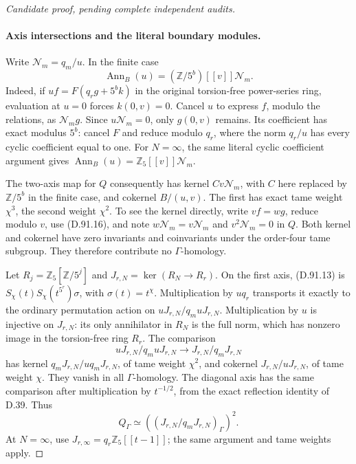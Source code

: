 \begin{proof}[Candidate proof, pending complete independent audits]
\paragraph{Axis intersections and the literal boundary modules.}
Write \(\mathcal N_m=q_m/u\). In the finite case
\[
                 \operatorname{Ann}_B(u)
                   =(\mathbb Z/5^b)[[v]]\mathcal N_m.
                                                               \tag{D.91.16}
\]
Indeed, if \(uf=F(q_rg+5^b k)\) in the original
torsion-free power-series ring, evaluation at \(u=0\)
forces \(k(0,v)=0\). Cancel \(u\) to express \(f\),
modulo the relations, as \(\mathcal N_m g\). Since
\(u\mathcal N_m=0\), only \(g(0,v)\) remains. Its
coefficient has exact modulus \(5^b\): cancel \(F\)
and reduce modulo \(q_r\), where the norm
\(q_r/u\) has every cyclic coefficient equal to one.
For \(N=\infty\), the same literal cyclic coefficient
argument gives \(\operatorname{Ann}_B(u)=\mathbb Z_5[[v]]\mathcal N_m\).

The two-axis map for \(Q\) consequently has kernel
\(Cv\mathcal N_m\), with \(C\) here replaced by
\(\mathbb Z/5^b\) in the finite case, and cokernel
\(B/(u,v)\). The first has exact tame weight \(\chi^3\),
the second weight \(\chi^2\). To see the kernel directly,
write \(vf=wg\), reduce modulo \(v\), use (D.91.16),
and note \(w\mathcal N_m=v\mathcal N_m\) and
\(v^2\mathcal N_m=0\) in \(Q\). Both kernel and
cokernel have zero invariants and coinvariants under the
order-four tame subgroup. They therefore contribute no
\(\Gamma\)-homology.

Let \(R_j=\mathbb Z_5[\mathbb Z/5^j]\) and
\(J_{r,N}=\ker(R_N\to R_r)\). On the first axis,
(D.91.13) is
\(S_\chi(t)S_\chi(t^{5^r})\sigma\), with
\(\sigma(t)=t^\chi\). Multiplication by \(u q_r\)
transports it exactly to the ordinary permutation action on
\(uJ_{r,N}/q_m uJ_{r,N}\). Multiplication by \(u\)
is injective on \(J_{r,N}\): its only annihilator in
\(R_N\) is the full norm, which has nonzero image in
the torsion-free ring \(R_r\). The comparison
\[
       uJ_{r,N}/q_m uJ_{r,N}
                      \longrightarrow J_{r,N}/q_mJ_{r,N}
                                                               \tag{D.91.17}
\]
has kernel \(q_mJ_{r,N}/u q_mJ_{r,N}\), of tame
weight \(\chi^2\), and cokernel \(J_{r,N}/uJ_{r,N}\),
of tame weight \(\chi\). They vanish in all
\(\Gamma\)-homology. The diagonal axis has the same
comparison after multiplication by \(t^{-1/2}\), from
the exact reflection identity of D.39. Thus
\[
 Q_\Gamma\simeq
          \left((J_{r,N}/q_mJ_{r,N})_\Gamma\right)^2.
                                                               \tag{D.91.18}
\]
At \(N=\infty\), use \(J_{r,\infty}=q_r\mathbb Z_5[[t-1]]\);
the same argument and tame weights apply.


\end{proof}
